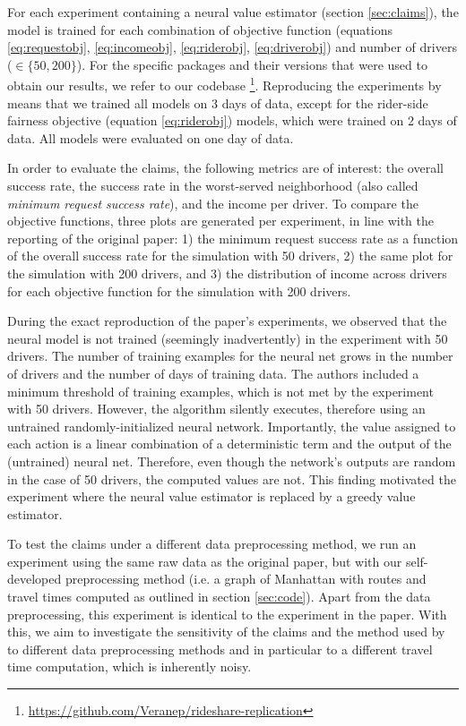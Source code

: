 For each experiment containing a neural value estimator (section \ref{sec:claims}), the model is trained for each combination of objective function (equations \ref{eq:requestobj}, \ref{eq:incomeobj}, \ref{eq:riderobj}, \ref{eq:driverobj}) and number of drivers ($\in \{50, 200\}$). For the specific packages and their versions that were used to obtain our results, we refer to our codebase \footnote{\url{https://github.com/Veranep/rideshare-replication}}. Reproducing the experiments by \cite{raman_data-driven_2021} means that we trained all models on 3 days of data, except for the rider-side fairness objective (equation \ref{eq:riderobj}) models, which were trained on 2 days of data. All models were evaluated on one day of data.

In order to evaluate the claims, the following metrics are of interest: the overall success rate, the success rate in the worst-served neighborhood (also called \textit{minimum request success rate}), and the income per driver. To compare the objective functions, three plots are generated per experiment, in line with the reporting of the original paper: 1) the minimum request success rate as a function of the overall success rate for the simulation with 50 drivers, 2) the same plot for the simulation with 200 drivers, and 3) the distribution of income across drivers for each objective function for the simulation with 200 drivers.

During the exact reproduction of the paper's experiments, we observed that the neural model is not trained (seemingly inadvertently) in the experiment with 50 drivers. The number of training examples for the neural net grows in the number of drivers and the number of days of training data. The authors included a minimum threshold of training examples, which is not met by the experiment with 50 drivers. However, the algorithm silently executes, therefore using an untrained randomly-initialized neural network. Importantly, the value assigned to each action is a linear combination of a deterministic term and the output of the (untrained) neural net. Therefore, even though the network's outputs are random in the case of 50 drivers, the computed values are not. This finding motivated the experiment where the neural value estimator is replaced by a greedy value estimator.

To test the claims under a different data preprocessing method, we run an experiment using the same raw data as the original paper, but with our self-developed preprocessing method (i.e. a graph of Manhattan with routes and travel times computed as outlined in section \ref{sec:code}). Apart from the data preprocessing, this experiment is identical to the experiment in the paper. With this, we aim to investigate the sensitivity of the claims and the method used by \cite{raman_data-driven_2021} to different data preprocessing methods and in particular to a different travel time computation, which is inherently noisy.

